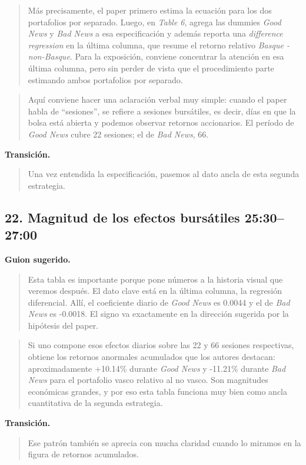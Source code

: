 \documentclass[11pt]{article}
\newcommand{\slideentry}[2]{\subsection*{#1 \hfill #2}}
\begin{document}
\begin{quote}
Más precisamente, el paper primero estima la ecuación para los dos portafolios por separado. Luego, en \emph{Table 6}, agrega las dummies \emph{Good News} y \emph{Bad News} a esa especificación y además reporta una \emph{difference regression} en la última columna, que resume el retorno relativo \emph{Basque - non-Basque}. Para la exposición, conviene concentrar la atención en esa última columna, pero sin perder de vista que el procedimiento parte estimando ambos portafolios por separado.
\end{quote}

\begin{quote}
Aquí conviene hacer una aclaración verbal muy simple: cuando el paper habla de ``sesiones'', se refiere a sesiones bursátiles, es decir, días en que la bolsa está abierta y podemos observar retornos accionarios. El período de \emph{Good News} cubre 22 sesiones; el de \emph{Bad News}, 66.
\end{quote}

\textbf{Transición.}
\begin{quote}
Una vez entendida la especificación, pasemos al dato ancla de esta segunda estrategia.
\end{quote}

\slideentry{22. Magnitud de los efectos bursátiles}{25:30--27:00}

\textbf{Guion sugerido.}
\begin{quote}
Esta tabla es importante porque pone números a la historia visual que veremos después. El dato clave está en la última columna, la regresión diferencial. Allí, el coeficiente diario de \emph{Good News} es 0.0044 y el de \emph{Bad News} es -0.0018. El signo va exactamente en la dirección sugerida por la hipótesis del paper.
\end{quote}

\begin{quote}
Si uno compone esos efectos diarios sobre las 22 y 66 sesiones respectivas, obtiene los retornos anormales acumulados que los autores destacan: aproximadamente +10.14\% durante \emph{Good News} y -11.21\% durante \emph{Bad News} para el portafolio vasco relativo al no vasco. Son magnitudes económicas grandes, y por eso esta tabla funciona muy bien como ancla cuantitativa de la segunda estrategia.
\end{quote}

\textbf{Transición.}
\begin{quote}
Ese patrón también se aprecia con mucha claridad cuando lo miramos en la figura de retornos acumulados.
\end{quote}
\end{document}
